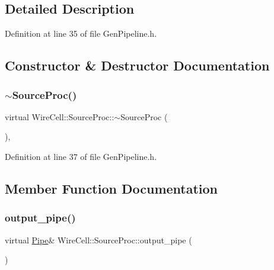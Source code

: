 \subsection{Detailed Description}


Definition at line 35 of file Gen\+Pipeline.\+h.



\subsection{Constructor \& Destructor Documentation}
\mbox{\label{class_wire_cell_1_1_source_proc_a752f9d797d4cd9d65ce24acad7b9296c}} 
\subsubsection{\texorpdfstring{$\sim$\+Source\+Proc()}{~SourceProc()}}
{\footnotesize\ttfamily virtual Wire\+Cell\+::\+Source\+Proc\+::$\sim$\+Source\+Proc (\begin{DoxyParamCaption}{ }\end{DoxyParamCaption})\hspace{0.3cm}{\ttfamily [inline]}, {\ttfamily [virtual]}}



Definition at line 37 of file Gen\+Pipeline.\+h.



\subsection{Member Function Documentation}
\mbox{\label{class_wire_cell_1_1_source_proc_a480b8ba5e80e9e7c6ffdf0b5d9fd0578}} 
\subsubsection{\texorpdfstring{output\+\_\+pipe()}{output\_pipe()}}
{\footnotesize\ttfamily virtual \hyperlink{namespace_wire_cell_afce9bb01c731347c3d4c8ca9d4ed804f}{Pipe}\& Wire\+Cell\+::\+Source\+Proc\+::output\+\_\+pipe (\begin{DoxyParamCaption}{ }\end{DoxyParamCaption})\hspace{0.3cm}{\ttfamily [pure virtual]}}



